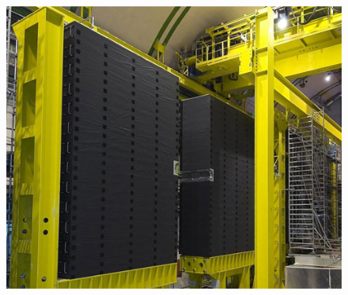 \begin{frame}
     \begin{figure}[h]
        \centering
        \includegraphics[height=\textheight]{Figures Introductory Lecture/LHCb Detector/LHCb_HCAL.jpg}%
        \end{figure}
\end{frame}
